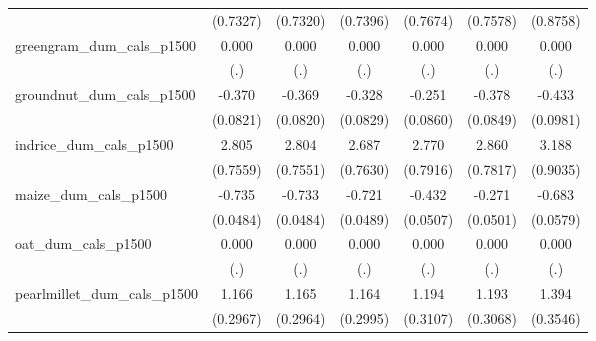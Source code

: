 {\begin{tabular}{l*{6}{c}}
                    &    (0.7327)         &    (0.7320)         &    (0.7396)         &    (0.7674)         &    (0.7578)         &    (0.8758)         \\
\addlinespace
greengram\_dum\_cals\_p1500&       0.000         &       0.000         &       0.000         &       0.000         &       0.000         &       0.000         \\
                    &         (.)         &         (.)         &         (.)         &         (.)         &         (.)         &         (.)         \\
\addlinespace
groundnut\_dum\_cals\_p1500&      -0.370\sym{***}&      -0.369\sym{***}&      -0.328\sym{***}&      -0.251\sym{**} &      -0.378\sym{***}&      -0.433\sym{***}\\
                    &    (0.0821)         &    (0.0820)         &    (0.0829)         &    (0.0860)         &    (0.0849)         &    (0.0981)         \\
\addlinespace
indrice\_dum\_cals\_p1500&       2.805\sym{***}&       2.804\sym{***}&       2.687\sym{***}&       2.770\sym{***}&       2.860\sym{***}&       3.188\sym{***}\\
                    &    (0.7559)         &    (0.7551)         &    (0.7630)         &    (0.7916)         &    (0.7817)         &    (0.9035)         \\
\addlinespace
maize\_dum\_cals\_p1500&      -0.735\sym{***}&      -0.733\sym{***}&      -0.721\sym{***}&      -0.432\sym{***}&      -0.271\sym{***}&      -0.683\sym{***}\\
                    &    (0.0484)         &    (0.0484)         &    (0.0489)         &    (0.0507)         &    (0.0501)         &    (0.0579)         \\
\addlinespace
oat\_dum\_cals\_p1500  &       0.000         &       0.000         &       0.000         &       0.000         &       0.000         &       0.000         \\
                    &         (.)         &         (.)         &         (.)         &         (.)         &         (.)         &         (.)         \\
\addlinespace
pearlmillet\_dum\_cals\_p1500&       1.166\sym{***}&       1.165\sym{***}&       1.164\sym{***}&       1.194\sym{***}&       1.193\sym{***}&       1.394\sym{***}\\
                    &    (0.2967)         &    (0.2964)         &    (0.2995)         &    (0.3107)         &    (0.3068)         &    (0.3546)         \\

\end{tabular}}

